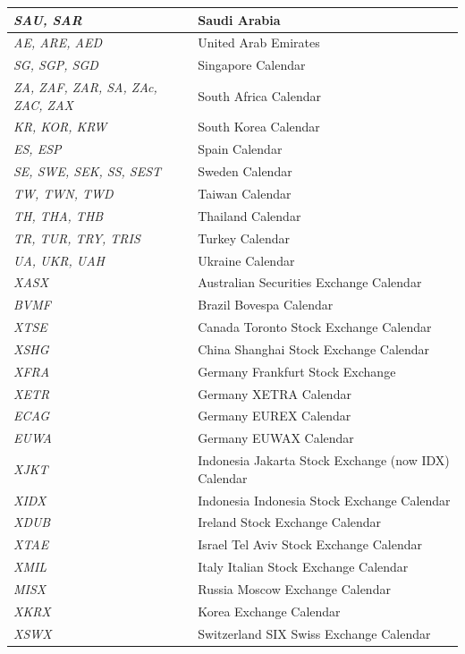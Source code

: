 \begin{longtable}{| p{} | p{} |}
    \emph{SAU, SAR} & Saudi Arabia \\ \hline
    \emph{AE, ARE, AED} & United Arab Emirates \\ \hline
    \emph{SG, SGP, SGD} & Singapore Calendar \\ \hline
    \emph{ZA, ZAF, ZAR, SA, ZAc, ZAC, ZAX} & South Africa Calendar \\ \hline    
    \emph{KR, KOR, KRW} & South Korea Calendar \\ \hline
    \emph{ES, ESP} & Spain Calendar \\ \hline
    \emph{SE, SWE, SEK, SS, SEST} & Sweden Calendar \\ \hline        
    \emph{TW, TWN, TWD} & Taiwan Calendar \\ \hline
    \emph{TH, THA, THB} & Thailand Calendar \\ \hline
    \emph{TR, TUR, TRY, TRIS} & Turkey Calendar \\ \hline
    \emph{UA, UKR, UAH} & Ukraine Calendar \\ \hline
    \emph{XASX} & Australian Securities Exchange Calendar \\ \hline
    \emph{BVMF} & Brazil Bovespa Calendar \\ \hline
    \emph{XTSE} & Canada Toronto Stock Exchange Calendar \\ \hline
    \emph{XSHG} & China Shanghai Stock Exchange Calendar \\ \hline
    \emph{XFRA} & Germany Frankfurt Stock Exchange \\ \hline
    \emph{XETR} & Germany XETRA Calendar \\ \hline
    \emph{ECAG} & Germany EUREX Calendar \\ \hline
    \emph{EUWA} & Germany EUWAX Calendar \\ \hline
    \emph{XJKT} & Indonesia Jakarta Stock Exchange (now IDX) Calendar \\ \hline
    \emph{XIDX} & Indonesia Indonesia Stock Exchange Calendar \\ \hline
    \emph{XDUB} & Ireland Stock Exchange Calendar \\ \hline
    \emph{XTAE} & Israel Tel Aviv Stock Exchange Calendar \\ \hline
    \emph{XMIL} & Italy Italian Stock Exchange Calendar \\ \hline
    \emph{MISX} & Russia Moscow Exchange Calendar \\ \hline
    \emph{XKRX} & Korea Exchange Calendar \\ \hline
    \emph{XSWX} & Switzerland SIX Swiss Exchange Calendar \\ \hline

\end{longtable}
